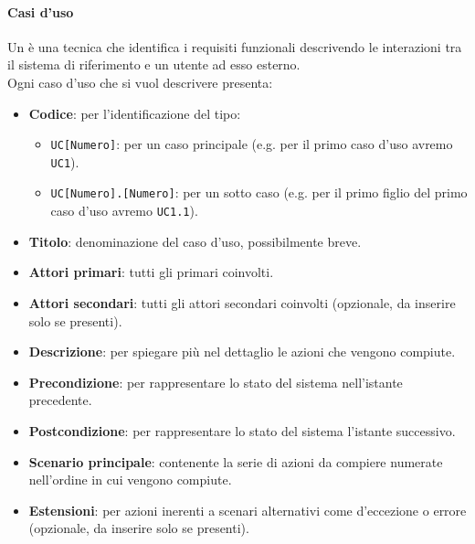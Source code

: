 		\paragraph{Casi d'uso}\label{PP:Sviluppo:AdR:CasiUso}
		Un  è una tecnica che identifica i requisiti funzionali descrivendo le interazioni tra il sistema di riferimento e un utente ad esso esterno.\\
		Ogni caso d'uso che si vuol descrivere presenta:
		\begin{itemize}
		 	\item \textbf{Codice}: per l'identificazione del tipo:
		 	\begin{itemize}
		 		\item \texttt{UC[Numero]}: per un caso principale (e.g. per il primo caso d'uso avremo \texttt{UC1}).
		 		\item \texttt{UC[Numero].[Numero]}: per un sotto caso (e.g. per il primo figlio del primo caso d'uso avremo \texttt{UC1.1}).
		 	\end{itemize}
		 	\item \textbf{Titolo}: denominazione del caso d'uso, possibilmente breve.
		 	\item \textbf{Attori primari}: tutti gli  primari coinvolti.
		 	\item \textbf{Attori secondari}: tutti gli attori secondari coinvolti (opzionale, da inserire solo se presenti).		 	
		 	\item \textbf{Descrizione}: per spiegare più nel dettaglio le azioni che vengono compiute.
		 	\item \textbf{Precondizione}: per rappresentare lo stato del sistema nell'istante precedente.
		 	\item \textbf{Postcondizione}: per rappresentare lo stato del sistema l'istante successivo.
		 	\item \textbf{Scenario principale}: contenente la serie di azioni da compiere numerate nell'ordine in cui vengono compiute.
		 	\item \textbf{Estensioni}: per azioni inerenti a scenari alternativi come d'eccezione o errore (opzionale, da inserire solo se presenti).
		\end{itemize}


